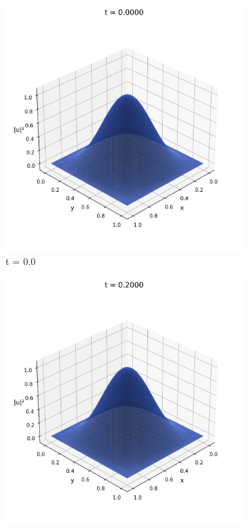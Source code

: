 \documentclass{article}
\theoremstyle{definition}
\theoremstyle{plain}
\theoremstyle{remark}
\begin{document}
\begin{figure}[h]
  \centering
  \begin{subfigure}[b]{0.3\textwidth}
    \centering
    \includegraphics[width=\textwidth, trim=0cm 0cm 0cm 1cm, clip]{figures/fem_frame_0000.png}
    \caption{t = 0.0}
  \end{subfigure}
  \hfill
  \begin{subfigure}[b]{0.3\textwidth}
    \centering
    \includegraphics[width=\textwidth, trim=0cm 0cm 0cm 1cm, clip]{figures/fem_frame_0020.png}

\end{subfigure}
\end{figure}
\end{document}
